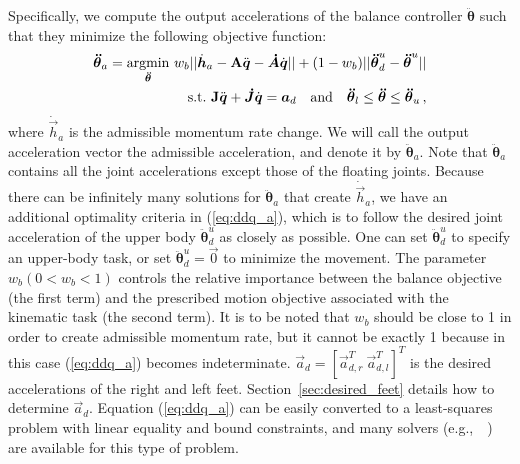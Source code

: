 \documentclass{llncs}
\newcommand{\mdJ} 	{\boldsymbol{\dot{J}}}
\newcommand{\mdA} 	{\boldsymbol{\dot{A}}}
\newcommand {\mat}[1] {{\bf #1}}
\newcommand{\mJ} {\mat{J}}
\newcommand{\vddth} {\boldsymbol{\ddot{\theta}}}
\newcommand{\vzero}{{\vec{0}}}
\newcommand{\va}{\vec{a}}
\newcommand{\vdh} {\dot{\vec{h}}}
\newcommand{\vdq} {\dot{\vec{q}}}
\newcommand{\vddq} {\ddot{\vec{q}}}
\begin{document}

Specifically, we compute the output accelerations of the balance controller $\vddth$ such that they minimize the following objective function:
\begin{equation}\begin{split}
		\vddth_a = \underset{\vddth}{\operatorname{argmin}}~w_b|| \vdh_a - \mat{A}\vddq - \mdA\vdq  || + (1-w_b)|| \vddth^u_d - \vddth^u || \\
		\text{s.t.~} \mJ\vddq + \mdJ\vdq = \va_d \quad \text{and} \quad \vddth_l \le \vddth \le \vddth_u  \, ,
\end{split}
\label{eq:ddq_a}
\end{equation}
where $\vdh_a$ is the admissible momentum rate change.
We will call the output acceleration vector the admissible acceleration,
and denote it by $\vddth_a$. Note that $\vddth_a$ contains all the joint 
accelerations except those of the floating joints.
Because there can be infinitely many solutions for $\vddth_a$
that create $\vdh_a$, we have an additional optimality
criteria in (\ref{eq:ddq_a}), which is to follow the desired joint acceleration of the upper body $\vddth^u_d$
as closely as possible.
One can set $\vddth^u_d$ to specify an upper-body task,
or set $\vddth^u_d=\vzero$ to minimize the movement.
The parameter $w_b (0 < w_b < 1)$ controls the relative
importance between the balance objective (the first term)
and the prescribed motion objective associated with the
kinematic task (the second term).
It is to be noted that $w_b$ should be close to 1
in order to create admissible momentum rate, but it cannot be exactly 1
because in this case (\ref{eq:ddq_a}) becomes indeterminate.
$\va_d=[\va_{d,r}^T~\va_{d,l}^T]^T$ is the desired accelerations of the
right and left feet.
Section~\ref{sec:desired_feet} details how to determine $\va_d$.
 Equation (\ref{eq:ddq_a}) can be easily converted to a
least-squares problem with linear equality and bound constraints,
and many solvers (e.g.,~\cite{lourakis04LM}~) are available for this type of problem.
\end{document}
